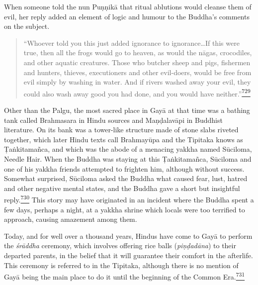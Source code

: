 \begin{description}
When someone told the nun Puṇṇikā that ritual ablutions would cleanse
them of evil, her reply added an element of logic and humour to the
Buddha's comments on the subject.

\begin{quote}
``Whoever told you this just added ignorance to ignorance\ldots If this
were true, then all the frogs would go to heaven, as would the nāgas,
crocodiles, and other aquatic creatures. Those who butcher sheep and
pigs, fishermen and hunters, thieves, executioners and other evil-doers,
would be free from evil simply by washing in water. And if rivers washed
away your evil, they could also wash away good you had done, and you
would have
neither.''\label{footprints_split_019.html_fnref729}\hyperref[footprints_split_025.htmlux5cux23fn729]{\textsuperscript{729}}
\end{quote}

Other than the Palgu, the most sacred place in Gayā at that time was a
bathing tank called Brahmasara in Hindu sources and Maṇḍalavāpi in
Buddhist literature. On its bank was a tower-like structure made of
stone slabs riveted together, which later Hindu texts call Brahmayūpa
and the Tipitaka knows as Ṭaṅkitamañca, and which was the abode of a
menacing yakkha named Sūciloma, Needle Hair. When the Buddha was staying
at this Ṭaṅkitamañca, Sūciloma and one of his yakkha friends attempted
to frighten him, although without success. Somewhat surprised, Sūciloma
asked the Buddha what caused fear, lust, hatred and other negative
mental states, and the Buddha gave a short but insightful
reply.\label{footprints_split_019.html_fnref730}\hyperref[footprints_split_025.htmlux5cux23fn730]{\textsuperscript{730}}
This story may have originated in an incident where the Buddha spent a
few days, perhaps a night, at a yakkha shrine which locals were too
terrified to approach, causing amazement among them.

Today, and for well over a thousand years, Hindus have come to Gayā to
perform the \emph{śrāddha} ceremony, which involves offering rice balls
(\emph{piṇḍadāna}) to their departed parents, in the belief that it will
guarantee their comfort in the afterlife. This ceremony is referred to
in the Tipitaka, although there is no mention of Gayā being the main
place to do it until the beginning of the Common
Era.\label{footprints_split_019.html_fnref731}\hyperref[footprints_split_025.htmlux5cux23fn731]{\textsuperscript{731}}


\end{description}
